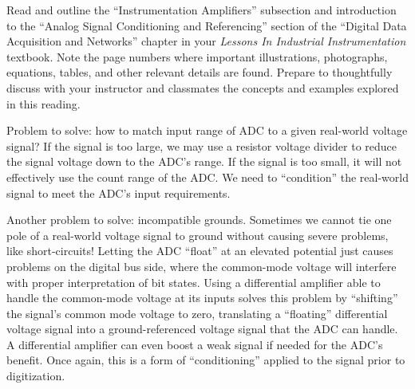 

Read and outline the ``Instrumentation Amplifiers'' subsection and introduction to the ``Analog Signal Conditioning and Referencing'' section of the ``Digital Data Acquisition and Networks'' chapter in your {\it Lessons In Industrial Instrumentation} textbook.  Note the page numbers where important illustrations, photographs, equations, tables, and other relevant details are found.  Prepare to thoughtfully discuss with your instructor and classmates the concepts and examples explored in this reading.














Problem to solve: how to match input range of ADC to a given real-world voltage signal?  If the signal is too large, we may use a resistor voltage divider to reduce the signal voltage down to the ADC's range.  If the signal is too small, it will not effectively use the count range of the ADC.  We need to ``condition'' the real-world signal to meet the ADC's input requirements.

\vskip 10pt

Another problem to solve: incompatible grounds.  Sometimes we cannot tie one pole of a real-world voltage signal to ground without causing severe problems, like short-circuits!  Letting the ADC ``float'' at an elevated potential just causes problems on the digital bus side, where the common-mode voltage will interfere with proper interpretation of bit states.  Using a differential amplifier able to handle the common-mode voltage at its inputs solves this problem by ``shifting'' the signal's common mode voltage to zero, translating a ``floating'' differential voltage signal into a ground-referenced voltage signal that the ADC can handle.  A differential amplifier can even boost a weak signal if needed for the ADC's benefit.  Once again, this is a form of ``conditioning'' applied to the signal prior to digitization.

\vskip 10pt

